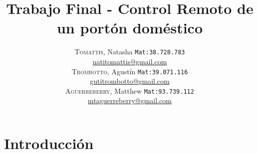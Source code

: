 \documentclass[16pt, article,notitlepage]{article}
\newcommand{\HRule}{\rule{\linewidth}{0.5mm}} %
\begin{document}
\begin{figure}[H] %
\end{figure}


\title{%
	{ \bfseries{Trabajo Final - Control Remoto de un portón doméstico}}\\[0.4cm]
} %
\author{
	\textsc{Tomattis}, Natasha  {\small \texttt{Mat:38.728.783}}\\
	\href{mailto:natitomattis@gmail.com}{natitomattis@gmail.com}\\
	\textsc{Trombotto}, Agustín  {\small \texttt{Mat:39.071.116}}\\
	\href{mailto:gutitrombotto@gmail.com}{gutitrombotto@gmail.com}\\
	\textsc{Aguerreberry}, Matthew  {\small \texttt{Mat:93.739.112}}\\
	\href{mailto:mtaguerreberry@gmail.com}{mtaguerreberry@gmail.com}\\
}

{\let\newpage\relax\maketitle}

\newpage

\maketitle
 
\tableofcontents

\newpage
\section{Introducción}
\end{document}

